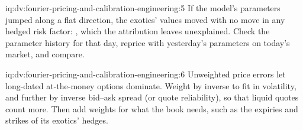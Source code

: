 \begin{solution}{iq:dv:fourier-pricing-and-calibration-engineering:5}
If the model's parameters jumped along a flat direction, the exotics' values moved with no move in any hedged risk factor: , which
the attribution leaves unexplained. Check the parameter history for that day, reprice with yesterday's parameters on today's market, and compare.
\end{solution}

\begin{solution}{iq:dv:fourier-pricing-and-calibration-engineering:6}
Unweighted price errors let long-dated at-the-money options dominate. Weight by inverse  to fit in volatility, and further by inverse bid--ask
spread (or quote reliability), so that liquid quotes count more. Then add weights for what the book needs, such as the expiries and strikes of its
exotics' hedges.
\end{solution}
